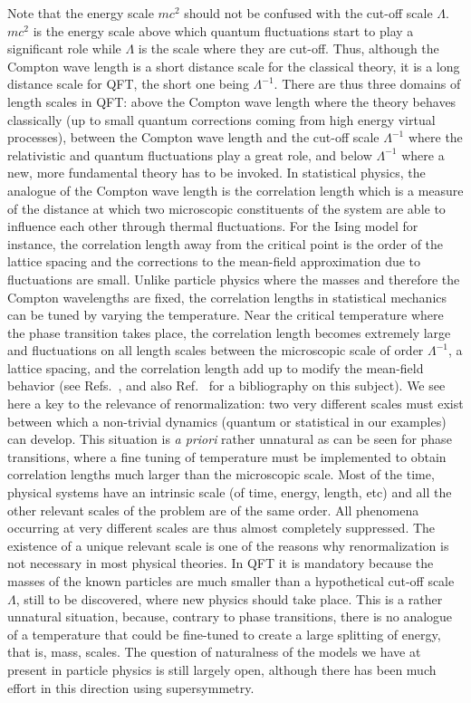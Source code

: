 \documentclass[floatfix,twocolumn,preprintnumbers,amsmath,amssymb,prb]{revtex4}
\begin{document}
{Note that the energy scale $m c^2$ should not be confused with
the cut-off scale
$\Lambda$. $m c^2$ is the energy scale above which quantum
fluctuations start to play a significant role while
$\Lambda$ is the scale where they are cut-off. Thus, although the
Compton wave length is a short distance scale for the classical
theory, it is a long distance scale for QFT, the short one being
$\Lambda^{-1}$. There are thus three domains of length scales in
QFT: above the Compton wave length where the theory behaves
classically (up to small quantum corrections coming from high
energy virtual processes), between the Compton wave length and
the cut-off scale $\Lambda^{-1}$ where the relativistic and
quantum fluctuations play a great role, and below $\Lambda^{-1}$
where a new, more fundamental theory has to be
invoked.\cite{lepage89} In statistical physics, the analogue of
the Compton wave length is the correlation length which is a
measure of the distance at which two microscopic constituents of
the system are able to
influence each other through thermal fluctuations.\cite{foot11}
 For the Ising model for instance, the
correlation length away from the critical point 
 is the order of the lattice spacing and the
corrections to the mean-field approximation due to fluctuations
are small. Unlike particle physics where the masses and therefore
the Compton wavelengths
are fixed, the correlation lengths in statistical mechanics can
be tuned by varying the temperature. Near the critical temperature
where the phase transition
takes place, the correlation length becomes extremely large 
and fluctuations on all length scales between the microscopic
scale of order
$\Lambda^{-1}$, a lattice spacing,
and the correlation length add up to modify the mean-field
behavior (see Refs.~,  
and also Ref.~ for a 
bibliography on this subject). We see here a key to the
relevance of renormalization: two very different scales must exist
between which a non-trivial dynamics (quantum or statistical in
our examples) can develop. This situation is {\em a priori} rather
unnatural as can be seen for phase transitions,
where a fine tuning of temperature must be implemented to obtain
correlation lengths much larger than the microscopic scale. Most
of the time, physical systems have an intrinsic scale (of time,
energy, length, etc) and all the other relevant scales of the
problem are of the same order. All phenomena occurring at very
different scales are thus almost completely suppressed. The existence
of a unique relevant scale is one of the reasons why renormalization is not
necessary in most physical theories. In QFT it is mandatory
because the masses of the known particles are much smaller
than a hypothetical cut-off scale $\Lambda$, still to be
discovered, where new physics should take place. This is a rather
unnatural situation, because, contrary to phase transitions, there
is no analogue of a temperature that could be fine-tuned to
create a large splitting of energy, that is, mass, scales. The
question of naturalness of the models we have at present in
particle physics is still largely open, although there has been
much effort in this direction using supersymmetry.

}
\end{document}
